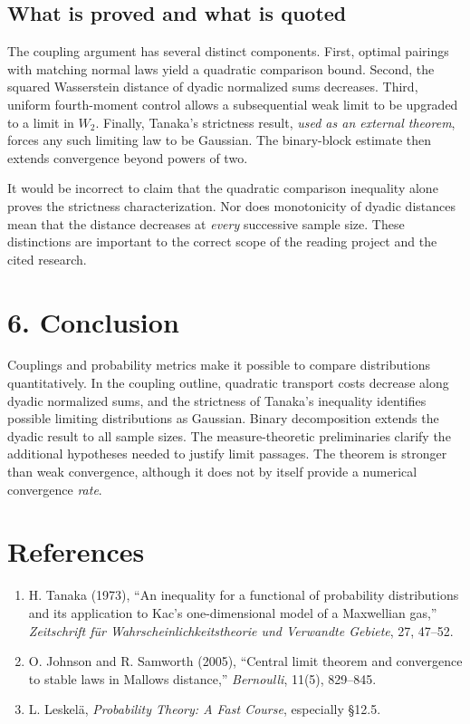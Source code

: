 \documentclass[10pt,a4paper]{article}
\begin{document}
\subsection*{What is proved and what is quoted}
The coupling argument has several distinct components. First, optimal pairings with matching normal laws yield a quadratic comparison bound. Second, the squared Wasserstein distance of dyadic normalized sums decreases. Third, uniform fourth-moment control allows a subsequential weak limit to be upgraded to a limit in $W_2$. Finally, Tanaka's strictness result, \emph{used as an external theorem}, forces any such limiting law to be Gaussian. The binary-block estimate then extends convergence beyond powers of two.

It would be incorrect to claim that the quadratic comparison inequality alone proves the strictness characterization. Nor does monotonicity of dyadic distances mean that the distance decreases at \emph{every} successive sample size. These distinctions are important to the correct scope of the reading project and the cited research.

\section*{6. Conclusion}
Couplings and probability metrics make it possible to compare distributions quantitatively. In the coupling outline, quadratic transport costs decrease along dyadic normalized sums, and the strictness of Tanaka's inequality identifies possible limiting distributions as Gaussian. Binary decomposition extends the dyadic result to all sample sizes. The measure-theoretic preliminaries clarify the additional hypotheses needed to justify limit passages. The theorem is stronger than weak convergence, although it does not by itself provide a numerical convergence \emph{rate}.

\section*{References}
\begin{enumerate}[leftmargin=*]
\item H. Tanaka (1973), ``An inequality for a functional of probability distributions and its application to Kac's one-dimensional model of a Maxwellian gas,'' \emph{Zeitschrift f\"ur Wahrscheinlichkeitstheorie und Verwandte Gebiete}, 27, 47--52.
\item O. Johnson and R. Samworth (2005), ``Central limit theorem and convergence to stable laws in Mallows distance,'' \emph{Bernoulli}, 11(5), 829--845.
\item L. Leskel\"a, \emph{Probability Theory: A Fast Course}, especially \S12.5.
\end{enumerate}
\end{document}
